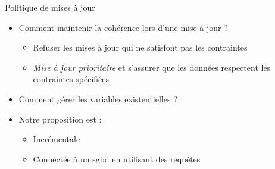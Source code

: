 \begin{frame}{Politique de mises à jour}
    
    \begin{block}{}
        \begin{itemize}
            \item Comment maintenir la cohérence lors d'une mise à jour ?
                    \begin{itemize}
                        \item<only@2-> Refuser les mises à jour qui ne satisfont pas les contraintes
                        \item<only@3-> \emph{Mise à jour prioritaire} et s'assurer que les données respectent les contraintes spécifiées \cite{chabinConsistentUpdatingDatabases2020} 
                    \end{itemize}
            \item<only@5-> Comment gérer les variables existentielles ? 
            \item<only@7-> Notre proposition est :
                \begin{itemize}
                    \item Incrémentale
                    \item Connectée à un \gls{sgbd} en utilisant des requêtes
                \end{itemize}
        \end{itemize}
    \end{block}

\end{frame}

